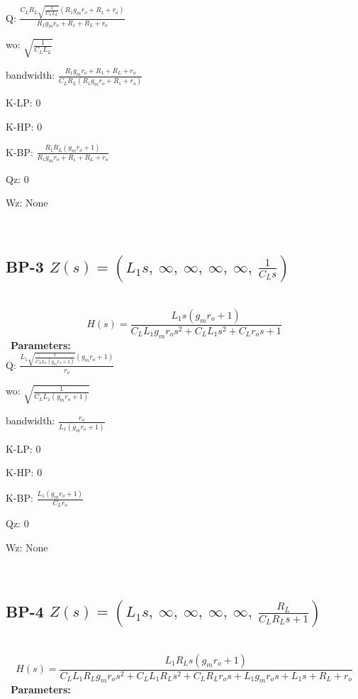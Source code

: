\documentclass{article}
\begin{document}
Q: $\frac{C_{L} R_{L} \sqrt{\frac{1}{C_{L} L_{L}}} \left(R_{1} g_{m} r_{o} + R_{1} + r_{o}\right)}{R_{1} g_{m} r_{o} + R_{1} + R_{L} + r_{o}}$\ 

wo: $\sqrt{\frac{1}{C_{L} L_{L}}}$\ 

bandwidth: $\frac{R_{1} g_{m} r_{o} + R_{1} + R_{L} + r_{o}}{C_{L} R_{L} \left(R_{1} g_{m} r_{o} + R_{1} + r_{o}\right)}$\ 

K-LP: $0$\ 

K-HP: $0$\ 

K-BP: $\frac{R_{1} R_{L} \left(g_{m} r_{o} + 1\right)}{R_{1} g_{m} r_{o} + R_{1} + R_{L} + r_{o}}$\ 

Qz: $0$\ 

Wz: $\text{None}$\ 

\ 

\subsection{BP-3 $Z(s) = \left( L_{1} s, \  \infty, \  \infty, \  \infty, \  \infty, \  \frac{1}{C_{L} s}\right)$ } \ 
\textbf{\[H(s) = \frac{L_{1} s \left(g_{m} r_{o} + 1\right)}{C_{L} L_{1} g_{m} r_{o} s^{2} + C_{L} L_{1} s^{2} + C_{L} r_{o} s + 1}\] } \ 
\textbf{Parameters:}\\ 

Q: $\frac{L_{1} \sqrt{\frac{1}{C_{L} L_{1} \left(g_{m} r_{o} + 1\right)}} \left(g_{m} r_{o} + 1\right)}{r_{o}}$\ 

wo: $\sqrt{\frac{1}{C_{L} L_{1} \left(g_{m} r_{o} + 1\right)}}$\ 

bandwidth: $\frac{r_{o}}{L_{1} \left(g_{m} r_{o} + 1\right)}$\ 

K-LP: $0$\ 

K-HP: $0$\ 

K-BP: $\frac{L_{1} \left(g_{m} r_{o} + 1\right)}{C_{L} r_{o}}$\ 

Qz: $0$\ 

Wz: $\text{None}$\ 

\ 

\subsection{BP-4 $Z(s) = \left( L_{1} s, \  \infty, \  \infty, \  \infty, \  \infty, \  \frac{R_{L}}{C_{L} R_{L} s + 1}\right)$ } \ 
\textbf{\[H(s) = \frac{L_{1} R_{L} s \left(g_{m} r_{o} + 1\right)}{C_{L} L_{1} R_{L} g_{m} r_{o} s^{2} + C_{L} L_{1} R_{L} s^{2} + C_{L} R_{L} r_{o} s + L_{1} g_{m} r_{o} s + L_{1} s + R_{L} + r_{o}}\] } \ 
\textbf{Parameters:}\\ 
\end{document}
